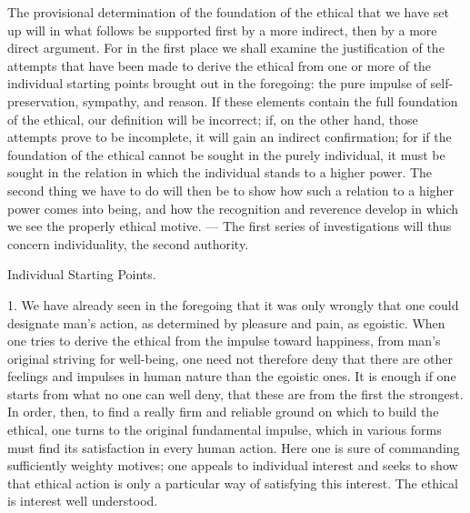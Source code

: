 \documentclass[12pt,a4paper,openany]{book}
\newcommand{\opage}[1]{\marginnote{\footnotesize\textit{[#1]}}}
\newcommand{\chap}[1]{\clearpage\addcontentsline{toc}{chapter}{#1}\vspace*{2em}\begin{center}{\large #1}\end{center}\medskip}
\begin{document}
The provisional determination of the foundation of the ethical that we have
set up will in what follows be supported first by a more indirect, then by
a more direct argument. For in the first place we shall examine the
justification of the attempts that have been made to derive the ethical
from one or more of the individual starting points brought out in the
foregoing: the pure impulse of \opage{18}self-preservation, sympathy, and
reason. If these elements contain the full foundation of the ethical, our
definition will be incorrect; if, on the other hand, those attempts prove
to be incomplete, it will gain an indirect confirmation; for if the
foundation of the ethical cannot be sought in the purely individual, it
must be sought in the relation in which the individual stands to a higher
power. The second thing we have to do will then be to show how such a
relation to a higher power comes into being, and how the recognition and
reverence develop in which we see the properly ethical motive.
--- The first series of investigations will thus concern individuality, the
second authority.

\chap{Individual Starting Points.}
\opage{19}1. We have already seen in the foregoing that it was only wrongly
that one could designate man's action, as determined by pleasure and pain, as
egoistic. When one tries to derive the ethical from the impulse toward
happiness, from man's original striving for well-being, one need not therefore
deny that there are other feelings and impulses in human nature than the
egoistic ones. It is enough if one starts from what no one can well deny, that
these are from the first the strongest. In order, then, to find a really firm
and reliable ground on which to build the ethical, one turns to the original
fundamental impulse, which in various forms must find its satisfaction in
every human action. Here one is sure of commanding sufficiently weighty
motives; one appeals to individual interest and seeks to show that ethical
action is only a \opage{20}particular way of satisfying this interest. The
ethical is interest well understood.
\end{document}
